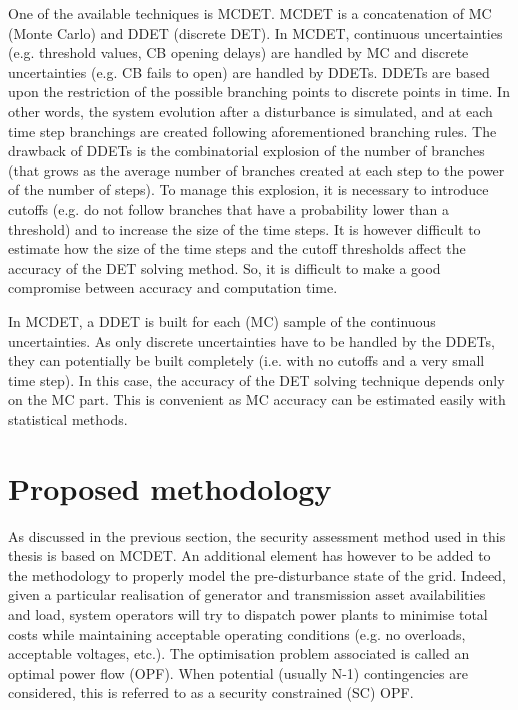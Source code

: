 One of the available techniques is MCDET. MCDET is a concatenation of MC (Monte Carlo) and DDET (discrete DET). In MCDET, continuous uncertainties (e.g. threshold values, CB opening delays) are handled by MC and discrete uncertainties (e.g. CB fails to open) are handled by DDETs. DDETs are based upon the restriction of the possible branching points to discrete points in time. In other words, the system evolution after a disturbance is simulated, and at each time step branchings are created following aforementioned branching rules. The drawback of DDETs is the combinatorial explosion of the number of branches (that grows as the average number of branches created at each step to the power of the number of steps). To manage this explosion, it is necessary to introduce cutoffs (e.g. do not follow branches that have a probability lower than a threshold) and to increase the size of the time steps. It is however difficult to estimate how the size of the time steps and the cutoff thresholds affect the accuracy of the DET solving method. So, it is difficult to make a good compromise between accuracy and computation time.

In MCDET, a DDET is built for each (MC) sample of the continuous uncertainties. As only discrete uncertainties have to be handled by the DDETs, they can potentially be built completely (i.e. with no cutoffs and a very small time step). In this case, the accuracy of the DET solving technique depends only on the MC part. This is convenient as MC accuracy can be estimated easily with statistical methods.


\section{Proposed methodology}
\label{sec:proposedMethodology}

As discussed in the previous section, the security assessment method used in this thesis is based on MCDET. An additional element has however to be added to the methodology to properly model the pre-disturbance state of the grid. Indeed, given a particular realisation of generator and transmission asset availabilities and load, system operators will try to dispatch power plants to minimise total costs while maintaining acceptable operating conditions (e.g. no overloads, acceptable voltages, etc.). The optimisation problem associated is called an optimal power flow (OPF). When potential (usually N-1) contingencies are considered, this is referred to as a security constrained (SC) OPF.

